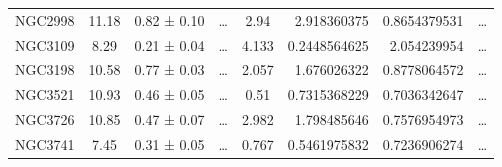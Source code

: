 \documentclass[reprint,%
 amsmath,amssymb,
 aps,
]{revtex4-1}
\begin{document}
\begin{table}[]
\begin{tabular}{cccccrrc}
\rowcolor[HTML]{F3F3F3} 
NGC2998              & 11.18                     & 0.82 ± 0.10           & …                      & 2.94                                                         & 2.918360375                                                           & 0.8654379531                                                          & …                                                             \\
\rowcolor[HTML]{F3F3F3} 
NGC3109              & 8.29                      & 0.21 ± 0.04           & …                      & 4.133                                                        & 0.2448564625                                                          & 2.054239954                                                           & …                                                             \\
\rowcolor[HTML]{F3F3F3} 
NGC3198              & 10.58                     & 0.77 ± 0.03           & …                      & 2.057                                                        & 1.676026322                                                           & 0.8778064572                                                          & …                                                             \\
\rowcolor[HTML]{F3F3F3} 
NGC3521              & 10.93                     & 0.46 ± 0.05           & …                      & 0.51                                                         & 0.7315368229                                                          & 0.7036342647                                                          & …                                                             \\
\rowcolor[HTML]{F3F3F3} 
NGC3726              & 10.85                     & 0.47 ± 0.07           & …                      & 2.982                                                        & 1.798485646                                                           & 0.7576954973                                                          & …                                                             \\
\rowcolor[HTML]{F3F3F3} 
NGC3741              & 7.45                      & 0.31 ± 0.05           & …                      & 0.767                                                        & 0.5461975832                                                          & 0.7236906274                                                          & …                                                             \\

\end{tabular}
\end{table}
\end{document}
